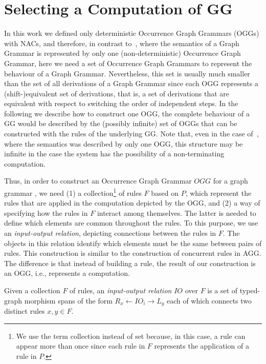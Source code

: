 \section{Selecting a Computation of GG}

  In this work we defined only deterministic Occurrence Graph Grammars (OGGs) with NACs, and therefore, in contrast to~\cite{Ribeiro1996}, where the semantics of a Graph Grammar is represented by only one (non-deterministic) Occurrence Graph Grammar, here we need a set of Occurrence Graph Grammars to represent the behaviour of a Graph Grammar.
  Nevertheless, this set is usually much smaller than the set of all derivations of a Graph Grammar since each OGG represents a (shift-)equivalent set of derivations, that is, a set of derivations that are equivalent with respect to switching the order of independent steps. 
  In the following we describe how to construct one OGG, the complete behaviour of a GG would be described by the (possibly infinite) set of OGGs that can be constructed with the rules of the underlying GG. Note that, even in the case of~\cite{Ribeiro1996}, where the semantics was described by only one OGG, this structure may be  infinite in the case the system has the possibility of a non-terminating computation.

  Thus, in order to construct an Occurrence Graph Grammar $OGG$ for a graph grammar \graphGrammar{}, we need (1) a collection\footnote{ We use the term collection instead of set because, in this case, a rule can appear more than once since each rule in $F$ represents the application of a rule in $P$.} of rules $F$ based on $P$, which represent the rules that are applied in the computation depicted by the OGG, and (2) a way of specifying how the rules in $F$ interact among themselves. 
  The latter is needed to define which elements are common throughout the rules. To this purpose, we use an \emph{input-output relation}, depicting connections between the rules in $F$.
  The objects in this relation identify which elements must be the same between pairs of rules.
  This construction is similar to the construction of concurrent rules in AGG.
  The difference is that instead of building a rule, the result of our construction is an OGG, i.e., represents a computation.

\begin{definition} Given a collection $F$ of rules, an \emph{input-output relation} $IO$ over $F$ is a set of typed-graph morphism spans of the form \mbox{$R_x \leftarrow IO_i \rightarrow L_y$} each of which connects two distinct rules $x,y \in F$.
\end{definition}

